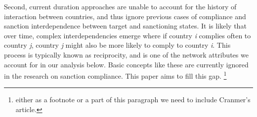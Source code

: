 Second, current duration approaches are unable to account for the history of interaction between countries, and thus ignore previous cases of compliance and sanction interdependence between target and sanctioning states. It is likely that over time, complex interdependencies emerge where if country \textit{i} complies often to country \textit{j}, country \textit{j} might also be more likely to comply to country \textit{i}. This process is typically known as reciprocity, and is one of the network attributes we account for in our analysis below. Basic concepts like these are currently ignored in the research on sanction compliance. This paper aims to fill this gap. \footnote{either as a footnote or a part of this paragraph we need to include Cranmer's article.} 



